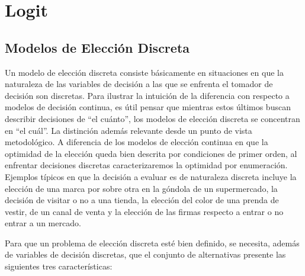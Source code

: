 \documentclass[
]{book}
\begin{document}
\section{Logit}\label{logit}

\subsection{Modelos de Elección Discreta}\label{modelos-de-elecciuxf3n-discreta}

Un modelo de elección discreta consiste básicamente en situaciones en que la naturaleza de las variables de decisión a las que se enfrenta el tomador de decisión son discretas. Para ilustrar la intuición de la diferencia con respecto a modelos de decisión continua, es útil pensar que mientras estos últimos buscan describir decisiones de ``el cuánto'', los modelos de elección discreta se concentran en ``el cuál''. La distinción además relevante desde un punto de vista metodológico. A diferencia de los modelos de elección continua en que la optimidad de la elección queda bien descrita por
condiciones de primer orden, al enfrentar decisiones discretas caracterizaremos la optimidad por enumeración. Ejemplos típicos en que la decisión a evaluar es de naturaleza discreta incluye la elección de una marca por sobre otra en la góndola de un supermercado, la decisión de visitar o no a una tienda, la elección del color de una prenda de vestir, de un canal de venta y la elección de las firmas respecto a entrar o no entrar a un mercado.

Para que un problema de elección discreta esté bien definido, se necesita, además de variables de decisión discretas, que el conjunto de alternativas presente las siguientes tres características:
\end{document}

